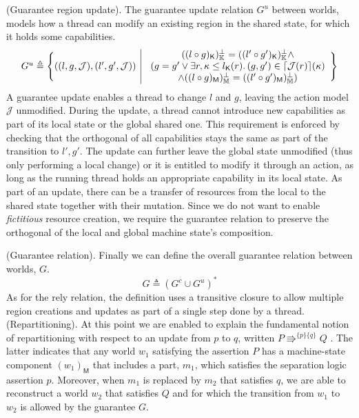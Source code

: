 (Guarantee region update). The guarantee update relation $G^u$ between worlds, models how a thread can modify an existing region in the shared state, for which it holds some capabilities.
\[
\begin{array}{r | l}
	G^u \triangleq \Bigg\{ ((l, g, \mathcal{J}), (l', g', \mathcal{J}))
	&
	\begin{array}{c}
		((l \circ g)_\mathsf{K})_\mathbb{K}^\bot = ((l' \circ g')_\mathsf{K})_\mathbb{K}^\bot \land \\
		(g = g' \lor \exists r, \kappa \leq l_\mathsf{K}(r) \ldotp (g, g') \in \lceil \mathcal{J}(r) \rceil(\kappa)  \\ \land ((l \circ g)_\mathsf{M})_\mathbb{M}^\bot = ((l' \circ g')_\mathsf{M})_\mathbb{M}^\bot )
	\end{array}
	\Bigg\}
\end{array}
\]
A guarantee update enables a thread to change $l$ and $g$, leaving the action model $\mathcal{J}$ unmodified. During the update, a thread cannot introduce new capabilities as part of its local state or the global shared one. This requirement is enforced by checking that the orthogonal of all capabilities stays the same as part of the transition to $l', g'$. The update can further leave the global state unmodified (thus only performing a local change) or it is entitled to modify it through an action, as long as the running thread holds an appropriate capability in its local state. As part of an update, there can be a transfer of resources from the local to the shared state together with their mutation. Since we do not want to enable \textit{fictitious} resource creation, we require the guarantee relation to preserve the orthogonal of the local and global machine state's composition.

 (Guarantee relation). Finally we can define the overall guarantee relation between worlds, $G$.
\[
	G \triangleq (G^c \cup G^u)^*
\]
As for the rely relation, the definition uses a transitive closure to allow multiple region creations and updates as part of a single step done by a thread. \\

 (Repartitioning). \label{repartitioning} At this point we are enabled to explain the fundamental notion of repartitioning with respect to an update from $p$ to $q$, written $P \Rrightarrow^{\{p\}\{q\}} Q$ \cite{cap}. The latter indicates that any world $w_1$ satisfying the assertion $P$ has a machine-state component $(w_1)_\mathsf{M}$ that includes a part, $m_1$, which satisfies the separation logic assertion $p$. Moreover, when $m_1$ is replaced by $m_2$ that satisfies $q$, we are able to reconstruct a world $w_2$ that satisfies $Q$ and for which the transition from $w_1$ to $w_2$ is allowed by the guarantee $G$.

